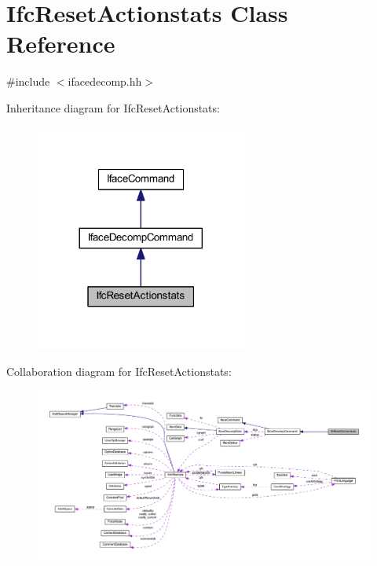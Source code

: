 \hypertarget{class_ifc_reset_actionstats}{}\section{Ifc\+Reset\+Actionstats Class Reference}
\label{class_ifc_reset_actionstats}


{\ttfamily \#include $<$ifacedecomp.\+hh$>$}



Inheritance diagram for Ifc\+Reset\+Actionstats\+:
\nopagebreak
\begin{figure}[H]
\begin{center}
\leavevmode
\includegraphics[width=197pt]{class_ifc_reset_actionstats__inherit__graph}
\end{center}
\end{figure}


Collaboration diagram for Ifc\+Reset\+Actionstats\+:
\nopagebreak
\begin{figure}[H]
\begin{center}
\leavevmode
\includegraphics[width=350pt]{class_ifc_reset_actionstats__coll__graph}
\end{center}
\end{figure}
